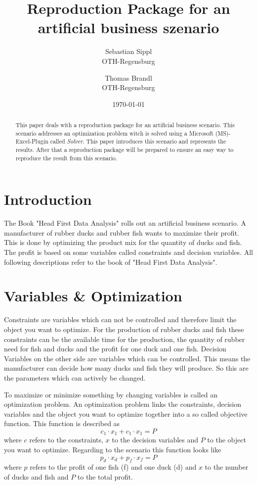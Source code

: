 \documentclass{article}
\title{\textbf{Reproduction Package for an artificial business szenario}}
\author{Sebastian Sippl  \\
	OTH-Regensburg  \\
	\and 
	Thomas Brandl \\
	OTH-Regensburg  \\
	}
\date{\today}
\begin{document}
\maketitle
\begin{abstract}
This paper deals with a reproduction package for an artificial business scenario. This scenario addresses an optimization problem witch is solved using a Microsoft (MS)-Excel-Plugin called \textit{Solver}. This paper introduces this scenario and represents the results. After that a reproduction package will be prepared to ensure an easy way to reproduce the result from this scenario.
\end{abstract}

\begin{multicols}{2}

\section{Introduction}
The Book "Head First Data Analysis" \cite{micheal} rolls out an artificial business scenario. A manufacturer of rubber ducks and rubber fish wants to maximize their profit. This is done by optimizing the product mix for the quantity of ducks and fish. The profit is based on some variables called constraints and decision variables. All following descriptions refer to the book of "Head First Data Analysis".

\section{Variables \& Optimization}
Constraints are variables which can not be controlled and therefore limit the object you want to optimize. For the production of rubber ducks and fish these constraints can be the available time for the production, the quantity of rubber need for fish and ducks and the profit for one duck and one fish. Decision Variables on the other side are variables which can be controlled. This means the manufacturer can decide how many ducks and fish they will produce. So this are the parameters which can actively be changed. 

To maximize or minimize something by changing variables is called an optimization problem. An optimization problem links the constraints, decision variables and the object you want to optimize together into a so called objective function. This function is described as 
\begin{equation}
c_{1}\cdot x_{1} + c_{1}\cdot x_{1} = P
\end{equation}
where $c$ refers to the constraints, $x$ to the decision variables and $P$ to the object you want to optimize. Regarding to the scenario this function looks like 
\begin{equation}
p_{d}\cdot x_{d} + p_{f}\cdot x_{f} = P
\end{equation}
where $p$ refers to the profit of one fish (f) and one duck (d) and $x$ to the number of ducks and fish and $P$ to the total profit.


\end{multicols}
\end{document}
